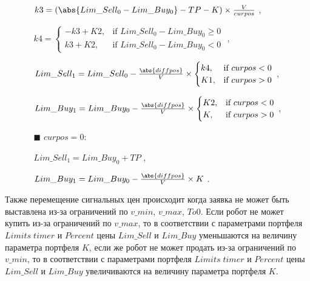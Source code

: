 \begin{itemize}
\begin{itemize}
	$k3 = \left(\abs{Lim\_Sell_0 - Lim\_Buy_0} - TP - K \right) \times \frac{V}{curpos}$ ,
	
	$k4 = \begin{cases} -k3 + K2, & \mbox{if } Lim\_Sell_0 - Lim\_Buy_0 \geq 0 \\ k3 + K2, & \mbox{if } Lim\_Sell_0 - Lim\_Buy_0 < 0 \end{cases}$ ,
	
	$Lim\_Sell_1 = Lim\_Sell_0 - \frac{\abs{diffpos}}{V} \times \begin{cases} k4, & \mbox{if } curpos < 0 \\ K1, & \mbox{if } curpos > 0 \end{cases}$ ,
	
	$Lim\_Buy_1 = Lim\_Buy_0 - \frac{\abs{diffpos}}{V} \times \begin{cases} K2, & \mbox{if } curpos < 0 \\ K, & \mbox{if } curpos > 0 \end{cases}$ ,
	
\item[\scriptsize$\blacksquare$] $curpos = 0$:
	
	$Lim\_Sell_1 = Lim\_Buy_0 + TP$ ,
	
	$Lim\_Buy_1 = Lim\_Buy_0 - \frac{\abs{diffpos}}{V} \times K$ .
	
\end{itemize}
\end{itemize}

Также перемещение сигнальных цен происходит когда заявка не может быть выставлена из-за ограничений по $v\_min$, $v\_max$, $To0$. Если робот не может купить из-за ограничений по
$v\_max$, то в соответствии с параметрами портфеля $Limits \; timer$ и $Percent$ цены $Lim\_Sell$ и $Lim\_Buy$ уменьшаются на величину параметра портфеля $K$, если же робот не может
продать из-за ограничений по $v\_min$, то в соответствии с параметрами портфеля $Limits \; timer$ и $Percent$ цены $Lim\_Sell$ и $Lim\_Buy$ увеличиваются на величину параметра
портфеля $K$.

\label{algo_features}

